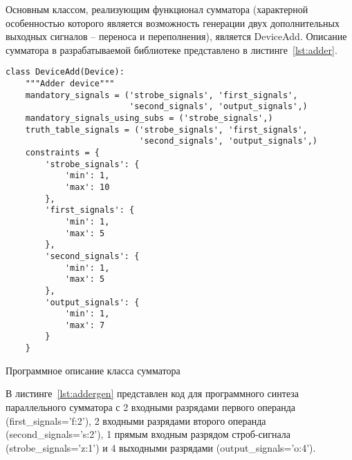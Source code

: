 \documentclass[document.tex]{subfiles}
\begin{document}
\clearpage

Основным классом, реализующим функционал сумматора (характерной особенностью
которого является возможность генерации двух дополнительных выходных сигналов --
переноса и переполнения), является DeviceAdd. Описание сумматора в
разрабатываемой библиотеке представлено в листинге~\ref{lst:adder}.

\begin{listing}[ht]
\begin{verbatim}
class DeviceAdd(Device):
    """Adder device"""
    mandatory_signals = ('strobe_signals', 'first_signals', 
                         'second_signals', 'output_signals',)
    mandatory_signals_using_subs = ('strobe_signals',)
    truth_table_signals = ('strobe_signals', 'first_signals', 
                           'second_signals', 'output_signals',)
    constraints = {
        'strobe_signals': {
            'min': 1,
            'max': 10
        },
        'first_signals': {
            'min': 1,
            'max': 5
        },
        'second_signals': {
            'min': 1,
            'max': 5
        },
        'output_signals': {
            'min': 1,
            'max': 7
        }
    }
\end{verbatim}
\caption{Программное описание класса сумматора}
\label{lst:adder}
\end{listing}

В листинге~\ref{lst:addergen} представлен код для программного синтеза
параллельного сумматора с 2 входными разрядами первого операнда
(first\_signals='f:2'), 2 входными разрядами второго операнда
(second\_signals='s:2'), 1 прямым входным разрядом строб-сигнала
(strobe\_signals='z:1') и 4 выходными разрядами (output\_signals='o:4').

\clearpage
\end{document}
